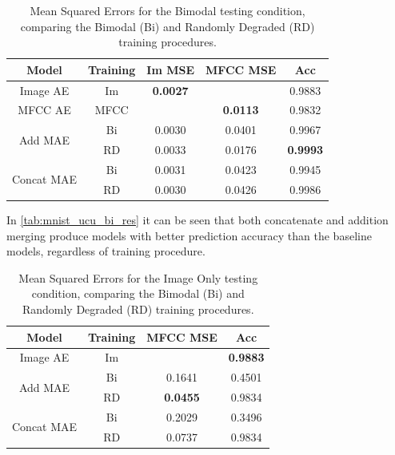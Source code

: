 \begin{table}[h]
	\centering
		\begin{tabular}{|c|c|c|c|c|}
		\hline
		\textbf{Model} & \textbf{Training} & \textbf{Im MSE} & \textbf{MFCC MSE} &  \textbf{Acc} \\ \hline
				Image AE & Im & 	\textbf{0.0027}	&	       			& 	0.9883			\\ \hline		
				MFCC AE & MFCC & 		    		& 	\textbf{0.0113} &	0.9832			\\ \hline		
\multirow{2}{*}{Add MAE} & Bi & 	0.0030			&	0.0401			&	0.9967			\\ \cline{2-5}
						  & RD &	0.0033			&	0.0176			&	\textbf{0.9993}	\\ \hline	
		
\multirow{2}{*}{Concat MAE} & Bi & 0.0031			&	0.0423			&	0.9945			\\ \cline{2-5}		
							 & RD & 0.0030			&	0.0426			&	0.9986			\\ \hline
		\end{tabular}
		\caption{Mean Squared Errors for the Bimodal testing condition, comparing the Bimodal (Bi) and Randomly Degraded (RD) training procedures.}
		\label{tab:mnist_ucu_bi_res}

\end{table}

In \autoref{tab:mnist_ucu_bi_res} it can be seen that both concatenate and addition merging produce models with better prediction accuracy than the baseline models, regardless of training procedure.

\begin{table}
	\centering
		\begin{tabular}{|c|c|c|c|}
		\hline
		\textbf{Model} & \textbf{Training} &  \textbf{MFCC MSE} &  \textbf{Acc} \\ \hline
		Image AE & Im 		&  		    			& \textbf{0.9883}	\\ \hline		
\multirow{2}{*}{Add MAE} & Bi & 	0.1641			& 0.4501 			\\ \cline{2-4}
						  & RD & \textbf{0.0455}	& 0.9834 			\\ \hline	
		
\multirow{2}{*}{Concat MAE} & Bi & 	0.2029		&	0.3496 			\\ \cline{2-4}		
							 & RD & 	0.0737		&	0.9834 			\\ \hline
		\end{tabular}
		\caption{Mean Squared Errors for the Image Only testing condition, comparing the Bimodal (Bi) and Randomly Degraded (RD) training procedures.}
		\label{tab:mnist_ucu_im_res}

\end{table}

